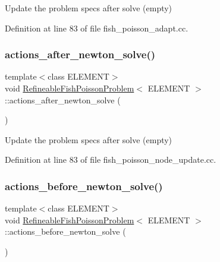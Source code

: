 Update the problem specs after solve (empty) 



Definition at line 83 of file fish\+\_\+poisson\+\_\+adapt.\+cc.

\mbox{\label{classRefineableFishPoissonProblem_a7f6c356f7c8bd0130de957297e999f40}} 
\subsubsection{\texorpdfstring{actions\+\_\+after\+\_\+newton\+\_\+solve()}{actions\_after\_newton\_solve()}\hspace{0.1cm}{\footnotesize\ttfamily [2/2]}}
{\footnotesize\ttfamily template$<$class E\+L\+E\+M\+E\+NT$>$ \\
void \hyperlink{classRefineableFishPoissonProblem}{Refineable\+Fish\+Poisson\+Problem}$<$ E\+L\+E\+M\+E\+NT $>$\+::actions\+\_\+after\+\_\+newton\+\_\+solve (\begin{DoxyParamCaption}{ }\end{DoxyParamCaption})\hspace{0.3cm}{\ttfamily [inline]}}



Update the problem specs after solve (empty) 



Definition at line 83 of file fish\+\_\+poisson\+\_\+node\+\_\+update.\+cc.

\mbox{\label{classRefineableFishPoissonProblem_a58098181f3b88c2fc65f24fb15c1a529}} 
\subsubsection{\texorpdfstring{actions\+\_\+before\+\_\+newton\+\_\+solve()}{actions\_before\_newton\_solve()}\hspace{0.1cm}{\footnotesize\ttfamily [1/2]}}
{\footnotesize\ttfamily template$<$class E\+L\+E\+M\+E\+NT$>$ \\
void \hyperlink{classRefineableFishPoissonProblem}{Refineable\+Fish\+Poisson\+Problem}$<$ E\+L\+E\+M\+E\+NT $>$\+::actions\+\_\+before\+\_\+newton\+\_\+solve (\begin{DoxyParamCaption}{ }\end{DoxyParamCaption})\hspace{0.3cm}{\ttfamily [inline]}}




